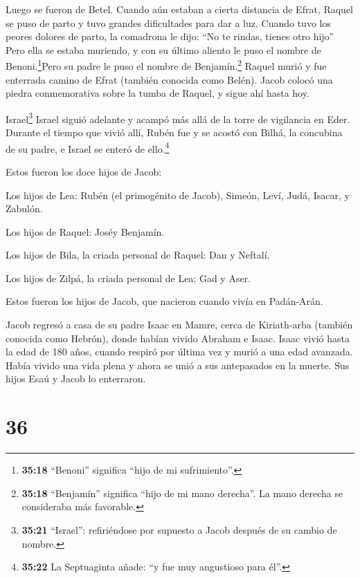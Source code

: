  Luego se fueron de Betel. Cuando aún estaban a cierta
distancia de Efrat, Raquel se puso de parto y tuvo grandes dificultades
para dar a luz.  Cuando tuvo los peores dolores de parto,
la comadrona le dijo: ``No te rindas, tienes otro hijo'' 
Pero ella se estaba muriendo, y con su último aliento le puso el nombre
de Benoni.\footnote{\textbf{35:18} ``Benoni'' significa ``hijo de mi
  sufrimiento''.}Pero su padre le puso el nombre de Benjamín.\footnote{\textbf{35:18}
  ``Benjamín'' significa ``hijo de mi mano derecha''. La mano derecha se
  consideraba más favorable.}  Raquel murió y fue enterrada
camino de Efrat (también conocida como Belén).  Jacob
colocó una piedra conmemorativa sobre la tumba de Raquel, y sigue ahí
hasta hoy.

 Israel\footnote{\textbf{35:21} ``Israel'': refiriéndose
  por supuesto a Jacob después de su cambio de nombre.} Israel siguió
adelante y acampó más allá de la torre de vigilancia en Eder.
 Durante el tiempo que vivió allí, Rubén fue y se acostó
con Bilhá, la concubina de su padre, e Israel se enteró de
ello.\footnote{\textbf{35:22} La Septuaginta añade: ``y fue muy
  angustioso para él''.}

Estos fueron los doce hijos de Jacob:

 Los hijos de Lea: Rubén (el primogénito de Jacob), Simeón,
Leví, Judá, Isacar, y Zabulón.

 Los hijos de Raquel: Joséy Benjamín.

 Los hijos de Bila, la criada personal de Raquel: Dan y
Neftalí.

 Los hijos de Zilpá, la criada personal de Lea: Gad y Aser.

Estos fueron los hijos de Jacob, que nacieron cuando vivía en
Padán-Arán.

 Jacob regresó a casa de su padre Isaac en Mamre, cerca de
Kiriath-arba (también conocida como Hebrón), donde habían vivido Abraham
e Isaac.  Isaac vivió hasta la edad de 180 años,
 cuando respiró por última vez y murió a una edad avanzada.
Había vivido una vida plena y ahora se unió a sus antepasados en la
muerte. Sus hijos Esaú y Jacob lo enterraron.

\hypertarget{section-35}{%
\section{36}\label{section-35}}

